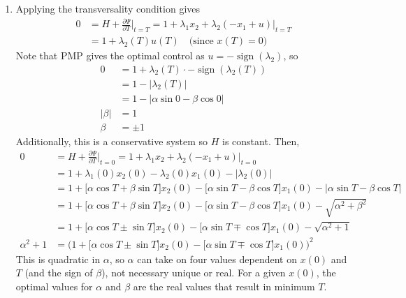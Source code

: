 \documentclass[letterpaper,11pt,titlepage]{article}
\DeclareMathOperator{\sign}{sign}
\newcommand*\pder[2]{\frac{\partial #1}{\partial #2}}
\begin{document}
\begin{enumerate}[leftmargin=0pt]
\begin{enumerate}
            \item Applying the transversality condition gives
                \begin{align}
                    0 &= H + \pder{\Psi}{T} \bigg|_{t=T} = 1 + \lambda_1 x_2 + \lambda_2 (-x_1 + u) \Big|_{t=T} \\
                      &= 1 + \lambda_2(T) u(T) \quad \text{(since $x(T)=0$)}
                \end{align}
                Note that PMP gives the optimal control as $u=-\sign(\lambda_2)$, so
                \begin{align}
                    0 &= 1 + \lambda_2(T) \cdot -\sign(\lambda_2(T)) \\
                      &= 1 - \big| \lambda_2(T) \big| \\
                      &= 1 - \big| \alpha\sin 0 - \beta\cos 0 \big| \\
                    |\beta| &= 1 \\
                    \beta &= \pm 1
                \end{align}
                Additionally, this is a conservative system so $H$ is constant. Then,
                \begin{align}
                    0 &= H + \pder{\Psi}{T} \bigg|_{t=0} = 1 + \lambda_1 x_2 + \lambda_2 (-x_1 + u) \Big|_{t=0} \\
                      &= 1 + \lambda_1(0) x_2(0) - \lambda_2(0) x_1(0) - \big|\lambda_2(0)\big| \\
                      &= 1 + \big[\alpha\cos T + \beta\sin T\big] x_2(0) - \big[\alpha\sin T - \beta\cos T\big] x_1(0) - \big|\alpha\sin T - \beta\cos T\big| \\
                      &= 1 + \big[\alpha\cos T + \beta\sin T\big] x_2(0) - \big[\alpha\sin T - \beta\cos T\big] x_1(0) - \sqrt{\alpha^2 + \beta^2} \\
                      &= 1 + \big[\alpha\cos T \pm \sin T\big] x_2(0) - \big[\alpha\sin T \mp \cos T\big] x_1(0) - \sqrt{\alpha^2 + 1} \\
                    \alpha^2 + 1 &= \Big( 1 + \big[\alpha\cos T \pm \sin T\big] x_2(0) - \big[\alpha\sin T \mp \cos T\big] x_1(0) \Big)^2
                \end{align}
                This is quadratic in $\alpha$, so $\alpha$ can take on four values dependent on $x(0)$ and $T$ (and the sign of $\beta$), not necessary unique or real. For a given $x(0)$, the optimal values for $\alpha$ and $\beta$ are the real values that result in minimum $T$. 
        \end{enumerate}


\end{enumerate}
\end{document}
